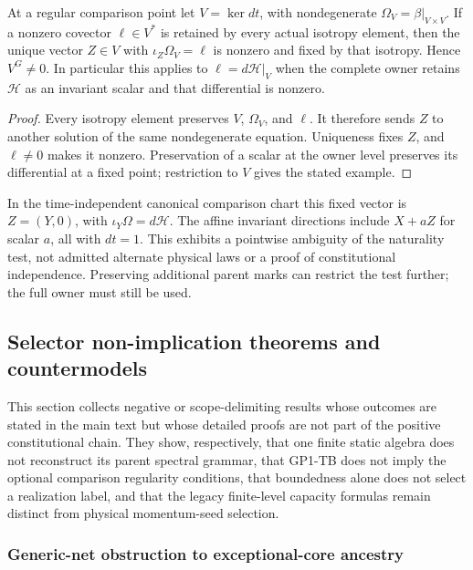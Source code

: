 \documentclass[11pt,a4paper]{article}
\begin{document}
\begin{proposition}
\label{p2a:prop:v2190-retained-mark-fixed-vector}
At a regular comparison point let \(V=\ker dt\), with nondegenerate
\(\Omega_V=\beta|_{V\times V}\).  If a nonzero covector
\(\ell\in V^*\) is retained by every actual isotropy element, then the
unique vector \(Z\in V\) with \(\iota_Z\Omega_V=\ell\) is nonzero and
fixed by that isotropy.  Hence \(V^G\ne0\).  In particular this applies
to \(\ell=d\mathcal H|_V\) when the complete owner retains
\(\mathcal H\) as an invariant scalar and that differential is nonzero.
\end{proposition}
\begin{proof}
Every isotropy element preserves \(V\), \(\Omega_V\), and \(\ell\).
It therefore sends \(Z\) to another solution of the same nondegenerate
equation.  Uniqueness fixes \(Z\), and \(\ell\ne0\) makes it nonzero.
Preservation of a scalar at the owner level preserves its differential
at a fixed point; restriction to \(V\) gives the stated example.
\end{proof}

In the time-independent canonical comparison chart this fixed vector is
\(Z=(Y,0)\), with \(\iota_Y\Omega=d\mathcal H\).
The affine invariant directions include \(X+aZ\) for scalar \(a\),
all with \(dt=1\).  This exhibits a pointwise ambiguity of the naturality
test, not admitted alternate physical laws or a proof of constitutional
independence.  Preserving additional parent marks can restrict the test
further; the full owner must still be used.



\subsection{Selector non-implication theorems and countermodels}
\label{p2:app:selector-limitations}
This section collects negative or scope-delimiting results whose outcomes are
stated in the main text but whose detailed proofs are not part of the positive
constitutional chain.  They show, respectively, that one finite static algebra
does not reconstruct its parent spectral grammar, that GP1-TB does not imply
the optional comparison regularity conditions, that boundedness alone does not
select a realization label, and that the legacy finite-level capacity formulas
remain distinct from physical momentum-seed selection.

\subsubsection{Generic-net obstruction to exceptional-core ancestry}
\label{p2a:app:generic-net-exceptional-obstruction}
\end{document}
